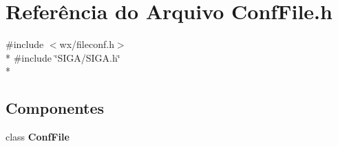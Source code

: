 \section{Referência do Arquivo Conf\+File.\+h}
\label{_conf_file_8h}
{\ttfamily \#include $<$wx/fileconf.\+h$>$}\\*
{\ttfamily \#include \char`\"{}S\+I\+G\+A/\+S\+I\+G\+A.\+h\char`\"{}}\\*
\subsection*{Componentes}
\begin{DoxyCompactItemize}
\item 
class {\bf Conf\+File}
\end{DoxyCompactItemize}
